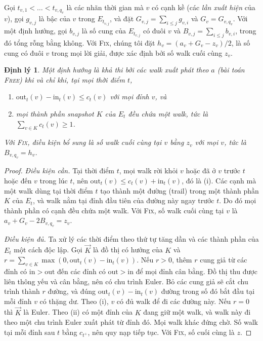 \documentclass[pdflatex,sn-mathphys-num]{sn-jnl}
\theoremstyle{thmstyleone}%
\newtheorem{theorem}{Định lý}%
\theoremstyle{thmstyletwo}%
\theoremstyle{thmstylethree}%
\newcommand{\out}{\mathrm{out}}
\newcommand{\inn}{\mathrm{in}}
\newcommand{\FIX}{\textup{\textsc{Fix}}}
\newcommand{\FREE}{\textup{\textsc{Free}}}
\begin{document}
Gọi $t_{v,1}<\dots<t_{v,q_v}$ là các nhãn thời gian mà $v$ có cạnh kề (các \emph{lần xuất hiện} của $v$), gọi $g_{v,j}$ là bậc của $v$ trong $E_{t_{v,j}}$, và đặt $G_{v,j}=\sum_{i\le j}g_{v,i}$ và $G_v=G_{v,q_v}$. Với một định hướng, gọi $b_{v,j}$ là số cung của $E_{t_{v,j}}$ có đuôi $v$ và $B_{v,j}=\sum_{i\le j}b_{v,i}$, trong đó tổng rỗng bằng không. Với \FIX{}, chúng tôi đặt $h_v=(a_v+G_v-z_v)/2$, là số cung có đuôi $v$ trong mọi lời giải, được xác định bởi số walk cuối cùng $z_v$.

\begin{theorem}\label{thm:char}
Một định hướng là khả thi bởi các walk xuất phát theo $a$ (bài toán \FREE{}) khi và chỉ khi, tại mọi thời điểm $t$,
\begin{enumerate}
\item[(i)] $\out_t(v)-\inn_t(v)\le c_t(v)$ với mọi đỉnh $v$, và
\item[(ii)] mọi thành phần snapshot $K$ của $E_t$ đều chứa một walk, tức là $\sum_{v\in K}c_t(v)\ge 1$.
\end{enumerate}
Với \FIX{}, điều kiện bổ sung là số walk cuối cùng tại $v$ bằng $z_v$ với mọi $v$, tức là $B_{v,q_v}=h_v$.
\end{theorem}

\begin{proof}
\emph{Điều kiện cần.} Tại thời điểm $t$, mọi walk rời khỏi $v$ hoặc đã ở $v$ trước $t$ hoặc đến $v$ trong lúc $t$, nên $\out_t(v)\le c_t(v)+\inn_t(v)$, đó là (i). Các cạnh mà một walk dùng tại thời điểm $t$ tạo thành một đường (trail) trong một thành phần $K$ của $E_t$, và walk nằm tại đỉnh đầu tiên của đường này ngay trước $t$. Do đó mọi thành phần có cạnh đều chứa một walk. Với \FIX{}, số walk cuối cùng tại $v$ là $a_v+G_v-2B_{v,q_v}=z_v$.

\emph{Điều kiện đủ.} Ta xử lý các thời điểm theo thứ tự tăng dần và các thành phần của $E_t$ một cách độc lập. Gọi $\vec K$ là đồ thị có hướng của $K$ và $r=\sum_{v\in K}\max(0,\out_t(v)-\inn_t(v))$. Nếu $r>0$, thêm $r$ cung giả từ các đỉnh có $\inn>\out$ đến các đỉnh có $\out>\inn$ để mọi đỉnh cân bằng. Đồ thị thu được liên thông yếu và cân bằng, nên có chu trình Euler. Bỏ các cung giả sẽ cắt chu trình thành $r$ đường, và đúng $\out_t(v)-\inn_t(v)$ đường trong số đó bắt đầu tại mỗi đỉnh $v$ có thặng dư. Theo (i), $v$ có đủ walk để đi các đường này. Nếu $r=0$ thì $\vec K$ là Euler. Theo (ii) có một đỉnh của $K$ đang giữ một walk, và walk này đi theo một chu trình Euler xuất phát từ đỉnh đó. Mọi walk khác đứng chờ. Số walk tại mỗi đỉnh sau $t$ bằng $c_{t^+}$, nên quy nạp tiếp tục. Với \FIX{}, số cuối cùng là $z$.
\end{proof}
\end{document}
